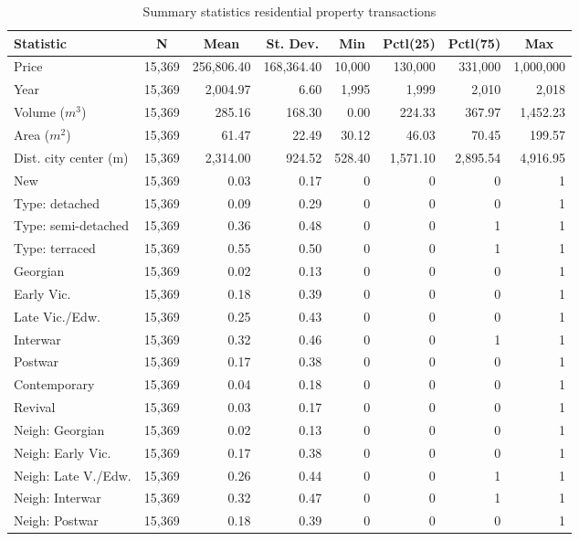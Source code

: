 \documentclass[]{article}
\begin{document}
\begin{table}[!htbp] \centering 
  \caption{Summary statistics residential property transactions} 
  \label{tab:sumstats} 
\begin{tabular}{@{\extracolsep{5pt}}lcrrrrrr} 
\toprule
Statistic & \multicolumn{1}{c}{N} & \multicolumn{1}{c}{Mean} & \multicolumn{1}{c}{St. Dev.} & \multicolumn{1}{c}{Min} & \multicolumn{1}{c}{Pctl(25)} & \multicolumn{1}{c}{Pctl(75)} & \multicolumn{1}{c}{Max} \\ 
\midrule
Price & 15,369 & 256,806.40 & 168,364.40 & 10,000 & 130,000 & 331,000 & 1,000,000 \\ 
Year & 15,369 & 2,004.97 & 6.60 & 1,995 & 1,999 & 2,010 & 2,018 \\ 
Volume ($m^3$) & 15,369 & 285.16 & 168.30 & 0.00 & 224.33 & 367.97 & 1,452.23 \\ 
Area ($m^2$)& 15,369 & 61.47 & 22.49 & 30.12 & 46.03 & 70.45 & 199.57 \\ 
Dist. city center (m) & 15,369 & 2,314.00 & 924.52 & 528.40 & 1,571.10 & 2,895.54 & 4,916.95 \\ 
New & 15,369 & 0.03 & 0.17 & 0 & 0 & 0 & 1 \\ 
Type: detached & 15,369 & 0.09 & 0.29 & 0 & 0 & 0 & 1 \\ 
Type: semi-detached & 15,369 & 0.36 & 0.48 & 0 & 0 & 1 & 1 \\ 
Type: terraced & 15,369 & 0.55 & 0.50 & 0 & 0 & 1 & 1 \\ 
\midrule
Georgian & 15,369 & 0.02 & 0.13 & 0 & 0 & 0 & 1 \\ 
Early Vic. & 15,369 & 0.18 & 0.39 & 0 & 0 & 0 & 1 \\ 
Late Vic./Edw. & 15,369 & 0.25 & 0.43 & 0 & 0 & 0 & 1 \\ 
Interwar & 15,369 & 0.32 & 0.46 & 0 & 0 & 1 & 1 \\ 
Postwar & 15,369 & 0.17 & 0.38 & 0 & 0 & 0 & 1 \\ 
Contemporary & 15,369 & 0.04 & 0.18 & 0 & 0 & 0 & 1 \\ 
Revival & 15,369 & 0.03 & 0.17 & 0 & 0 & 0 & 1 \\ 
\midrule
Neigh: Georgian & 15,369 & 0.02 & 0.13 & 0 & 0 & 0 & 1 \\ 
Neigh: Early Vic. & 15,369 & 0.17 & 0.38 & 0 & 0 & 0 & 1 \\ 
Neigh: Late V./Edw. & 15,369 & 0.26 & 0.44 & 0 & 0 & 1 & 1 \\ 
Neigh: Interwar & 15,369 & 0.32 & 0.47 & 0 & 0 & 1 & 1 \\ 
Neigh: Postwar & 15,369 & 0.18 & 0.39 & 0 & 0 & 0 & 1 \\ 

\end{tabular}
\end{table}
\end{document}
